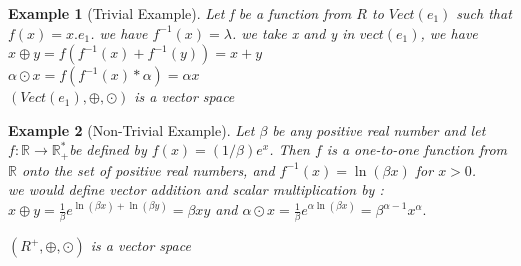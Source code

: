 \documentclass{report}
\newtheorem{Example}{Example}
\begin{document}
        \begin{Example}[Trivial Example]
            Let f be a function from $R$ to $Vect{(e_1)}$ such that $f(x) = x.e_1$.
            we have $f^{-1}(x) = \lambda$.
            we take x and y in $vect{(e_1)}$, we have \\
            $x\oplus y = f(f^{-1}(x) + f^{-1}(y)) = x + y$ \\
            $\alpha \odot x = f(f^{-1}(x) * \alpha) = \alpha x$ 
            \\
            $(Vect{(e_1)}, \oplus, \odot)$ is a vector space
        \end{Example}
        \begin{Example}[Non-Trivial Example]
            Let $\beta$ be any positive real number and let $f: \mathbb{R} \rightarrow \mathbb{R}_{+}^{*}$be
            defined by $f(x)=(1 / \beta) e^x$. Then $f$ is a one-to-one
            function from $\mathbb{R}$ onto the set of positive real numbers, 
            and $f^{-1}(x)=\ln (\beta x)$ for $x>0$. 
            \\
            we would define vector addition and scalar multiplication by :
            \\
            $
            x \oplus y=\frac{1}{\beta} e^{\ln (\beta x)+\ln (\beta y)}=\beta x y
            $
            and
            $
            \alpha \odot x=\frac{1}{\beta} e^{\alpha \ln (\beta x)}=\beta^{\alpha-1} x^\alpha.
            $

            $(R^+, \oplus, \odot)$ is a vector space 

        \end{Example}
\end{document}
